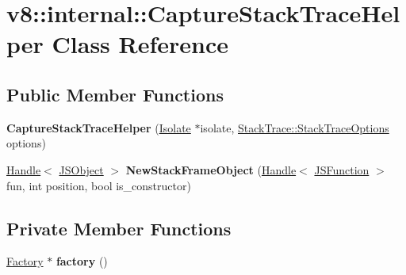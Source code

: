 \hypertarget{classv8_1_1internal_1_1_capture_stack_trace_helper}{}\section{v8\+:\+:internal\+:\+:Capture\+Stack\+Trace\+Helper Class Reference}
\label{classv8_1_1internal_1_1_capture_stack_trace_helper}
\subsection*{Public Member Functions}
\begin{DoxyCompactItemize}
\item 
{\bfseries Capture\+Stack\+Trace\+Helper} (\hyperlink{classv8_1_1internal_1_1_isolate}{Isolate} $\ast$isolate, \hyperlink{classv8_1_1_stack_trace_a9704e4a37949eb8eb8ccddbddf161492}{Stack\+Trace\+::\+Stack\+Trace\+Options} options)\hypertarget{classv8_1_1internal_1_1_capture_stack_trace_helper_a821cc5b41dbd9fa0575baa79b190abfe}{}\label{classv8_1_1internal_1_1_capture_stack_trace_helper_a821cc5b41dbd9fa0575baa79b190abfe}

\item 
\hyperlink{classv8_1_1internal_1_1_handle}{Handle}$<$ \hyperlink{classv8_1_1internal_1_1_j_s_object}{J\+S\+Object} $>$ {\bfseries New\+Stack\+Frame\+Object} (\hyperlink{classv8_1_1internal_1_1_handle}{Handle}$<$ \hyperlink{classv8_1_1internal_1_1_j_s_function}{J\+S\+Function} $>$ fun, int position, bool is\+\_\+constructor)\hypertarget{classv8_1_1internal_1_1_capture_stack_trace_helper_ae9f43a35f8a5819b470be76a2fd7467a}{}\label{classv8_1_1internal_1_1_capture_stack_trace_helper_ae9f43a35f8a5819b470be76a2fd7467a}

\end{DoxyCompactItemize}
\subsection*{Private Member Functions}
\begin{DoxyCompactItemize}
\item 
\hyperlink{classv8_1_1internal_1_1_factory}{Factory} $\ast$ {\bfseries factory} ()\hypertarget{classv8_1_1internal_1_1_capture_stack_trace_helper_af1d6128f066d5a01b90a921c9484789b}{}\label{classv8_1_1internal_1_1_capture_stack_trace_helper_af1d6128f066d5a01b90a921c9484789b}

\end{DoxyCompactItemize}
